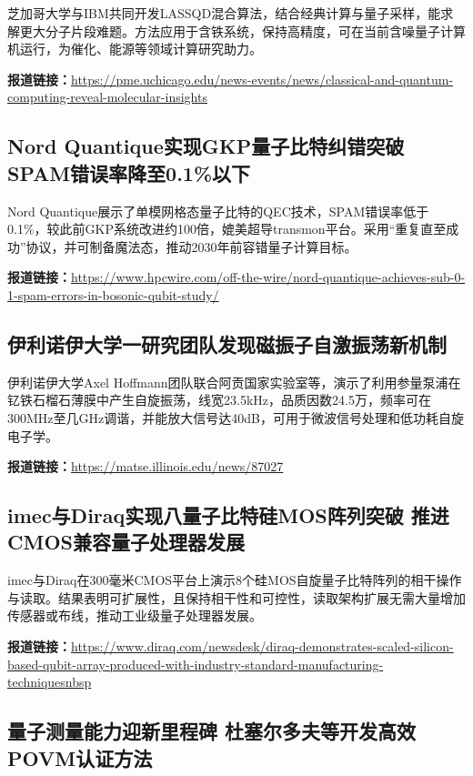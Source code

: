 \documentclass[12pt,a4paper]{ctexart}
\begin{document}
芝加哥大学与IBM共同开发LASSQD混合算法，结合经典计算与量子采样，能求解更大分子片段难题。方法应用于含铁系统，保持高精度，可在当前含噪量子计算机运行，为催化、能源等领域计算研究助力。

\noindent\textbf{报道链接：}\url{https://pme.uchicago.edu/news-events/news/classical-and-quantum-computing-reveal-molecular-insights}

\subsection{ Nord Quantique实现GKP量子比特纠错突破 SPAM错误率降至0.1\%以下 }

Nord Quantique展示了单模网格态量子比特的QEC技术，SPAM错误率低于0.1\%，较此前GKP系统改进约100倍，媲美超导transmon平台。采用“重复直至成功”协议，并可制备魔法态，推动2030年前容错量子计算目标。

\noindent\textbf{报道链接：}\url{https://www.hpcwire.com/off-the-wire/nord-quantique-achieves-sub-0-1-spam-errors-in-bosonic-qubit-study/}

\subsection{ 伊利诺伊大学一研究团队发现磁振子自激振荡新机制 }

伊利诺伊大学Axel Hoffmann团队联合阿贡国家实验室等，演示了利用参量泵浦在钇铁石榴石薄膜中产生自旋振荡，线宽23.5kHz，品质因数24.5万，频率可在300MHz至几GHz调谐，并能放大信号达40dB，可用于微波信号处理和低功耗自旋电子学。

\noindent\textbf{报道链接：}\url{https://matse.illinois.edu/news/87027}

\subsection{ imec与Diraq实现八量子比特硅MOS阵列突破 推进CMOS兼容量子处理器发展 }

imec与Diraq在300毫米CMOS平台上演示8个硅MOS自旋量子比特阵列的相干操作与读取。结果表明可扩展性，且保持相干性和可控性，读取架构扩展无需大量增加传感器或布线，推动工业级量子处理器发展。

\noindent\textbf{报道链接：}\url{https://www.diraq.com/newsdesk/diraq-demonstrates-scaled-silicon-based-qubit-array-produced-with-industry-standard-manufacturing-techniquesnbsp}

\subsection{ 量子测量能力迎新里程碑 杜塞尔多夫等开发高效POVM认证方法 }
\end{document}
